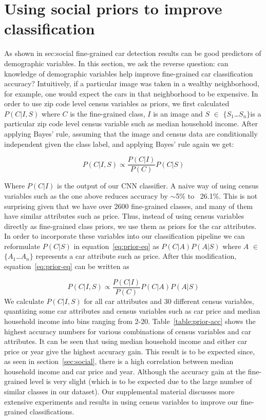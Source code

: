 \documentclass[10pt,twocolumn,letterpaper]{article}
\begin{document}
\section{Using social priors to improve classification}
\label{sec:prior}
As shown in {sec:social} fine-grained car detection results can be good predictors of demographic variables. In this section, we ask the reverse question: can knowledge of demographic variables help improve fine-grained car classification accuracy? Intuitively, if a particular image was taken in a wealthy neighborhood, for example, one would expect the cars in that neighborhood to be expensive. In order to use zip code level census variables as priors, we first calculated \(P(C|I,S)\) where \(C\) is the fine-grained class, \(I\) is an image and \(S\) \(\in\) \(\{\)\(S_{1}\)\ldots \(S_{n}\)\(\}\)is a particular zip code level census variable such as median household income. After applying Bayes' rule, assuming that the image and census data are conditionally independent given the class label, and applying Bayes' rule again we get:


\begin{equation}
P(C|I,S)\propto \frac{P(C|I)}{P(C)}P(C|S)
\label{eq:prior-eq}
\end{equation}

Where \(P(C|I)\) is the output of our CNN classifier. A naive way of using census variables such as the one above reduces accuracy by \(\sim\)5\% to ~26.1\%. This is not surprising given that we have over 2600 fine-grained classes, and many of them have similar attributes such as price. Thus, instead of using census variables directly as fine-grained class priors, we use them as priors for the car attributes. In order to incorporate these variables into our classification pipeline we can reformulate \(P(C|S)\) in equation~\ref{eq:prior-eq} as \(P(C|A)\)\(P(A|S)\) where \(A\) \(\in\) \(\{\)\(A_{1}\)\ldots\(A_{n}\)\(\}\) represents a car attribute such as price. After this modification, equation~\ref{eq:prior-eq} can be written as  

\begin{equation}
  P(C|I,S) \propto \frac{P(C|I)}{P(C)}P(C|A)P(A|S)
\end{equation}
We calculate \(P(C|I,S)\) for all car attributes and 30 different census variables, quantizing some car attributes and census variables such as car price and median household income into bins ranging from 2-20. Table~\ref{table:prior-acc} shows the highest accuracy numbers for various combinations of census variables and car attributes. It can be seen that using median household income and either car price or year give the highest accuracy gain. This result is to be expected since, as seen in section~\ref{sec:social}, there is a high correlation between median household income and car price and year. Although the accuracy gain at the fine-grained level is very slight (which is to be expected due to the large number of similar classes in our dataset). Our supplemental material discusses more extensive experiments and results in using census variables to improve our fine-grained classifications.
\end{document}

